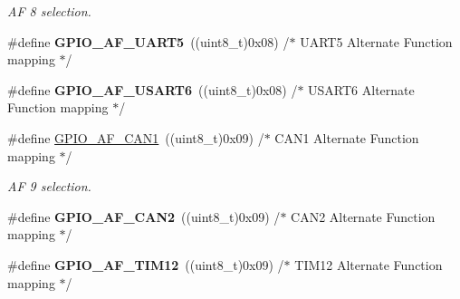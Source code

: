 \begin{DoxyCompactItemize}
\begin{DoxyCompactList}\small\item\em AF 8 selection. \end{DoxyCompactList}\item 
\#define {\bfseries G\+P\+I\+O\+\_\+\+A\+F\+\_\+\+U\+A\+R\+T5}~((uint8\+\_\+t)0x08)  /$\ast$ U\+A\+R\+T5 Alternate Function mapping $\ast$/\hypertarget{group___g_p_i_o___alternat__function__selection__define_ga6250acb0f2f3de33bc8e78615852cc48}{}\label{group___g_p_i_o___alternat__function__selection__define_ga6250acb0f2f3de33bc8e78615852cc48}

\item 
\#define {\bfseries G\+P\+I\+O\+\_\+\+A\+F\+\_\+\+U\+S\+A\+R\+T6}~((uint8\+\_\+t)0x08)  /$\ast$ U\+S\+A\+R\+T6 Alternate Function mapping $\ast$/\hypertarget{group___g_p_i_o___alternat__function__selection__define_gaf69942861848b5175369145ffc001c41}{}\label{group___g_p_i_o___alternat__function__selection__define_gaf69942861848b5175369145ffc001c41}

\item 
\#define \hyperlink{group___g_p_i_o___alternat__function__selection__define_gaf5defeedc302bf348e31dd7bdcdd882f}{G\+P\+I\+O\+\_\+\+A\+F\+\_\+\+C\+A\+N1}~((uint8\+\_\+t)0x09)  /$\ast$ C\+A\+N1 Alternate Function mapping $\ast$/\hypertarget{group___g_p_i_o___alternat__function__selection__define_gaf5defeedc302bf348e31dd7bdcdd882f}{}\label{group___g_p_i_o___alternat__function__selection__define_gaf5defeedc302bf348e31dd7bdcdd882f}

\begin{DoxyCompactList}\small\item\em AF 9 selection. \end{DoxyCompactList}\item 
\#define {\bfseries G\+P\+I\+O\+\_\+\+A\+F\+\_\+\+C\+A\+N2}~((uint8\+\_\+t)0x09)  /$\ast$ C\+A\+N2 Alternate Function mapping $\ast$/\hypertarget{group___g_p_i_o___alternat__function__selection__define_ga4896d720d93f50f17207b4059ab5ebfb}{}\label{group___g_p_i_o___alternat__function__selection__define_ga4896d720d93f50f17207b4059ab5ebfb}

\item 
\#define {\bfseries G\+P\+I\+O\+\_\+\+A\+F\+\_\+\+T\+I\+M12}~((uint8\+\_\+t)0x09)  /$\ast$ T\+I\+M12 Alternate Function mapping $\ast$/\hypertarget{group___g_p_i_o___alternat__function__selection__define_ga681ff7964f5d73ed973a299383b13c90}{}\label{group___g_p_i_o___alternat__function__selection__define_ga681ff7964f5d73ed973a299383b13c90}


\end{DoxyCompactItemize}
